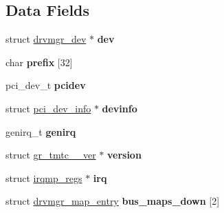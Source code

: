 \subsection*{Data Fields}
\begin{DoxyCompactItemize}
\item 
\mbox{\label{structgr__tmtc__1553__priv_ac40ec06a587cc7234f0bbaa0c500b2e2}} 
struct \mbox{\hyperlink{structdrvmgr__dev}{drvmgr\+\_\+dev}} $\ast$ {\bfseries dev}
\item 
\mbox{\label{structgr__tmtc__1553__priv_a79bd6335cd3a43fcf4ca153a993436c4}} 
char {\bfseries prefix} \mbox{[}32\mbox{]}
\item 
\mbox{\label{structgr__tmtc__1553__priv_a4f85d4cc6da80ec033ea8ff6b7369979}} 
pci\+\_\+dev\+\_\+t {\bfseries pcidev}
\item 
\mbox{\label{structgr__tmtc__1553__priv_a60753c9ff2baf0be1d71f124c08f5e42}} 
struct \mbox{\hyperlink{structpci__dev__info}{pci\+\_\+dev\+\_\+info}} $\ast$ {\bfseries devinfo}
\item 
\mbox{\label{structgr__tmtc__1553__priv_a3ef167419580adc9fa5611907174b35d}} 
genirq\+\_\+t {\bfseries genirq}
\item 
\mbox{\label{structgr__tmtc__1553__priv_adff50752b350d3d34937698d4c40d43e}} 
struct \mbox{\hyperlink{structgr__tmtc__1553__ver}{gr\+\_\+tmtc\+\_\+\_\+ver}} $\ast$ {\bfseries version}
\item 
\mbox{\label{structgr__tmtc__1553__priv_ae71bfbf98ccca24e29344fea74cdc1dd}} 
struct \mbox{\hyperlink{structirqmp__regs}{irqmp\+\_\+regs}} $\ast$ {\bfseries irq}
\item 
\mbox{\label{structgr__tmtc__1553__priv_a1b0bde60138411e8b156eafef3f31ec7}} 
struct \mbox{\hyperlink{structdrvmgr__map__entry}{drvmgr\+\_\+map\+\_\+entry}} {\bfseries bus\+\_\+maps\+\_\+down} \mbox{[}2\mbox{]}
\item 
\mbox{\label{structgr__tmtc__1553__priv_aedeac74d7ca06bec46c89b9051a5d2a8}} 

\end{DoxyCompactItemize}
